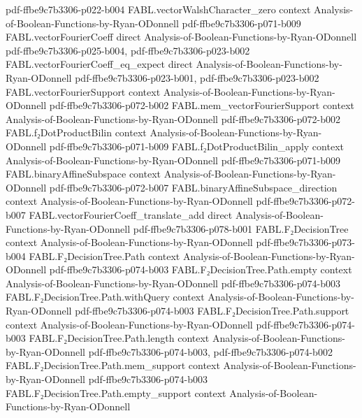 \begin{theorem}
  {pdf-ffbe9c7b3306-p022-b004}
\proofstep
  {FABL.vectorWalshCharacter_zero}
  {context}
  {Analysis-of-Boolean-Functions-by-Ryan-ODonnell}
  {pdf-ffbe9c7b3306-p071-b009}
\proofstep
  {FABL.vectorFourierCoeff}
  {direct}
  {Analysis-of-Boolean-Functions-by-Ryan-ODonnell}
  {pdf-ffbe9c7b3306-p025-b004,
    pdf-ffbe9c7b3306-p023-b002}
\proofstep
  {FABL.vectorFourierCoeff_eq_expect}
  {direct}
  {Analysis-of-Boolean-Functions-by-Ryan-ODonnell}
  {pdf-ffbe9c7b3306-p023-b001,
    pdf-ffbe9c7b3306-p023-b002}
\proofstep
  {FABL.vectorFourierSupport}
  {context}
  {Analysis-of-Boolean-Functions-by-Ryan-ODonnell}
  {pdf-ffbe9c7b3306-p072-b002}
\proofstep
  {FABL.mem_vectorFourierSupport}
  {context}
  {Analysis-of-Boolean-Functions-by-Ryan-ODonnell}
  {pdf-ffbe9c7b3306-p072-b002}
\proofstep
  {FABL.f₂DotProductBilin}
  {context}
  {Analysis-of-Boolean-Functions-by-Ryan-ODonnell}
  {pdf-ffbe9c7b3306-p071-b009}
\proofstep
  {FABL.f₂DotProductBilin_apply}
  {context}
  {Analysis-of-Boolean-Functions-by-Ryan-ODonnell}
  {pdf-ffbe9c7b3306-p071-b009}
\proofstep
  {FABL.binaryAffineSubspace}
  {context}
  {Analysis-of-Boolean-Functions-by-Ryan-ODonnell}
  {pdf-ffbe9c7b3306-p072-b007}
\proofstep
  {FABL.binaryAffineSubspace_direction}
  {context}
  {Analysis-of-Boolean-Functions-by-Ryan-ODonnell}
  {pdf-ffbe9c7b3306-p072-b007}
\proofstep
  {FABL.vectorFourierCoeff_translate_add}
  {direct}
  {Analysis-of-Boolean-Functions-by-Ryan-ODonnell}
  {pdf-ffbe9c7b3306-p078-b001}
\proofstep
  {FABL.F₂DecisionTree}
  {context}
  {Analysis-of-Boolean-Functions-by-Ryan-ODonnell}
  {pdf-ffbe9c7b3306-p073-b004}
\proofstep
  {FABL.F₂DecisionTree.Path}
  {context}
  {Analysis-of-Boolean-Functions-by-Ryan-ODonnell}
  {pdf-ffbe9c7b3306-p074-b003}
\proofstep
  {FABL.F₂DecisionTree.Path.empty}
  {context}
  {Analysis-of-Boolean-Functions-by-Ryan-ODonnell}
  {pdf-ffbe9c7b3306-p074-b003}
\proofstep
  {FABL.F₂DecisionTree.Path.withQuery}
  {context}
  {Analysis-of-Boolean-Functions-by-Ryan-ODonnell}
  {pdf-ffbe9c7b3306-p074-b003}
\proofstep
  {FABL.F₂DecisionTree.Path.support}
  {context}
  {Analysis-of-Boolean-Functions-by-Ryan-ODonnell}
  {pdf-ffbe9c7b3306-p074-b003}
\proofstep
  {FABL.F₂DecisionTree.Path.length}
  {context}
  {Analysis-of-Boolean-Functions-by-Ryan-ODonnell}
  {pdf-ffbe9c7b3306-p074-b003,
    pdf-ffbe9c7b3306-p074-b002}
\proofstep
  {FABL.F₂DecisionTree.Path.mem_support}
  {context}
  {Analysis-of-Boolean-Functions-by-Ryan-ODonnell}
  {pdf-ffbe9c7b3306-p074-b003}
\proofstep
  {FABL.F₂DecisionTree.Path.empty_support}
  {context}
  {Analysis-of-Boolean-Functions-by-Ryan-ODonnell}

\end{theorem}
